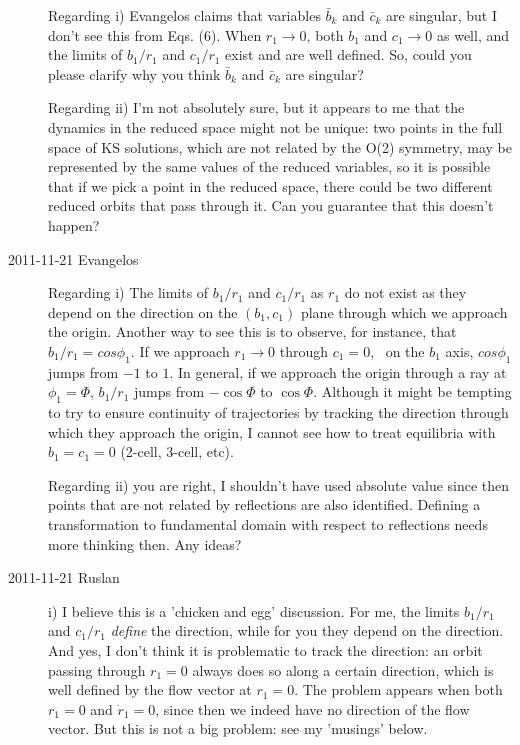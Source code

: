 \begin{description}
    Regarding i) Evangelos claims that variables $\bar{b}_k$ and
    $\bar{c}_k$ are singular, but I don't see this from Eqs. (6).  When
    $r_1 \to 0$, both $b_1$ and $c_1 \to 0$ as well, and the limits of
    $b_1/r_1$ and $c_1/r_1$ exist and are well defined.  So, could you
    please clarify why you think $\bar{b}_k$ and $\bar{c}_k$ are
    singular?

    Regarding ii) I'm not absolutely sure, but it appears to me that the
    dynamics in the reduced space might not be unique: two points in the
    full space of KS solutions, which are not related by the O(2)
    symmetry, may be represented by the same values of the reduced
    variables, so it is possible that if we pick a point in the reduced
    space, there could be two different reduced orbits that pass through
    it.  Can you guarantee that this doesn't happen?

\item[2011-11-21 Evangelos] Regarding i) The limits of
  $b_1/r_1$ and $c_1/r_1$ as $r_1$ do not exist as they depend on the
  direction on the $(b_1,c_1)$ plane through which we approach the origin.
  Another way to see this is to observe, for instance, that $b_1/r_1 = cos \phi_1$.
  If we approach $r_1\rightarrow0$ through $c_1=0$, \ie\ on the $b_1$ axis,
  $cos \phi_1$ jumps from $-1$ to $1$. In general, if we approach the origin
  through a ray at $\phi_1=\Phi$, $b_1/r_1$ jumps from $-\cos \Phi$ to $\cos \Phi$.
  Although it might be tempting to try to ensure continuity of trajectories by
  tracking the direction through which they approach the origin, I cannot see how
  to treat equilibria with $b_1=c_1=0$ (2-cell, 3-cell, etc).

  Regarding ii) you are right, I shouldn't have used absolute value since then
  points that are not related by reflections are also identified. Defining
  a transformation to fundamental domain with respect to reflections
  needs more thinking then. Any ideas?

\item[2011-11-21 Ruslan] i) I believe this is a 'chicken and egg' discussion.  For me, the limits $b_1/r_1$ and $c_1/r_1$ {\em define} the direction, while for you they depend on the direction.  And yes, I don't think it is problematic to track the direction: an orbit passing through $r_1 = 0$ always does so along a certain direction, which is well defined by the flow vector at $r_1 = 0$.  The problem appears when both $r_1 = 0$ and $\dot{r}_1 = 0$, since then we indeed have no direction of the flow vector.  But this is not a big problem: see my 'musings' below.


\end{description}
